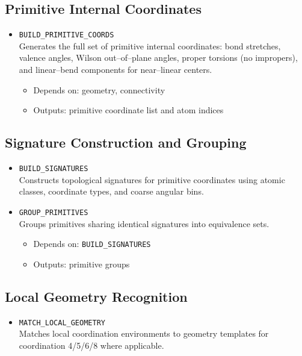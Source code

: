 \documentclass[11pt,a4paper]{article}
\begin{document}
\subsection{Primitive Internal Coordinates}

\begin{itemize}
  \item \texttt{BUILD\_PRIMITIVE\_COORDS} \\
  Generates the full set of primitive internal coordinates:
  bond stretches, valence angles, Wilson out--of--plane angles, proper
  torsions (no impropers), and linear--bend components for near--linear
  centers.
  \begin{itemize}
    \item Depends on: geometry, connectivity
    \item Outputs: primitive coordinate list and atom indices
  \end{itemize}
\end{itemize}

\subsection{Signature Construction and Grouping}

\begin{itemize}
  \item \texttt{BUILD\_SIGNATURES} \\
  Constructs topological signatures for primitive coordinates using atomic
  classes, coordinate types, and coarse angular bins.

  \item \texttt{GROUP\_PRIMITIVES} \\
  Groups primitives sharing identical signatures into equivalence sets.
  \begin{itemize}
    \item Depends on: \texttt{BUILD\_SIGNATURES}
    \item Outputs: primitive groups
  \end{itemize}
\end{itemize}

\subsection{Local Geometry Recognition}

\begin{itemize}
  \item \texttt{MATCH\_LOCAL\_GEOMETRY} \\
  Matches local coordination environments to geometry templates for
  coordination 4/5/6/8 where applicable.
\end{itemize}
\end{document}
